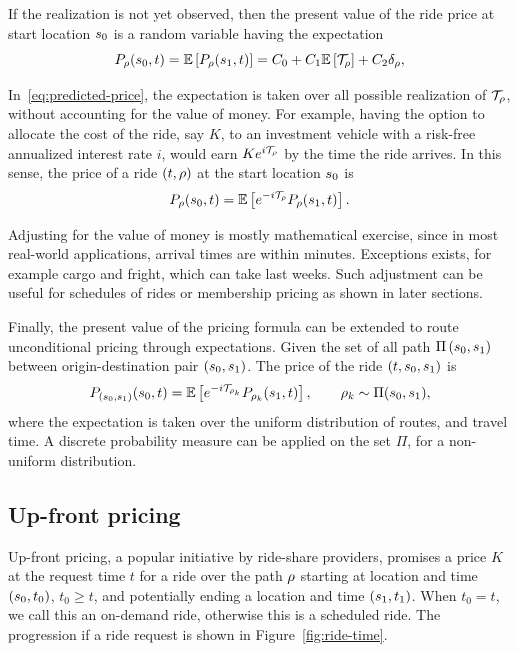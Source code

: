 \documentclass[12pt]{article}
\begin{document}
{{{{{{{{ If the realization is not yet observed, then the present value of the ride price at start location ${s_0}$ is a random variable having the expectation
\begin{equation}\label{eq:predicted-price}
    P_\rho({s_0}, t) = \mathbb{E}\left[P_\rho({ s_1}, t)\right]= C_0 + C_1\mathbb{E}\left[\mathcal{T}_\rho\right] + C_2 \delta_\rho,
 \end{equation}

In~\eqref{eq:predicted-price}, the expectation is taken over all possible realization of $\mathcal{T}_\rho$, without accounting for the value of money. For example, having the option to allocate the cost of the ride, say $K$, to an investment vehicle with a risk-free annualized interest rate $i$, would earn $Ke^{i\mathcal{T}_\rho}$ by the time the ride arrives. In this sense, the price of a ride $(t, \rho)$ at the start location ${s_0}$ is 
\[P_\rho({s_0}, t) = \mathbb{E}\left[e^{-i\mathcal{T}_\rho} P_\rho({ s_1}, t)\right]. \]

Adjusting for the value of money is mostly mathematical exercise, since in most real-world applications, arrival times are within minutes. Exceptions exists, for example cargo and fright, which can take last weeks. Such adjustment can be useful for schedules of rides or membership pricing as shown in later sections.

Finally, the present value of the pricing formula can be extended to route unconditional pricing through expectations. Given the set of all path $\Pi\left({s_0}, { s_1}\right)$  between origin-destination pair $({s_0}, { s_1})$. The price of the ride  $(t, {s_0}, { s_1})$ is
\[P_{\left({s_0}, { s_1}\right)}({s_0}, t) = \mathbb{E}\left[e^{-i\mathcal{T}_{\rho_k}}P_{\rho_k}({ s_1}, t)\right],\qquad \rho_k \sim \Pi({s_0}, { s_1}),\]
where the expectation is taken over the uniform distribution of routes, and travel time. A discrete probability measure can be applied on the set $\Pi$, for a non-uniform distribution.


\subsection{Up-front pricing} \label{sec:upfront}
Up-front pricing, a popular initiative by ride-share providers, promises a price $K$ at the request time $t$ for a ride over the path $\rho$ starting at location and time $({s_0}, t_0)$, $t_0\geq t$, and potentially ending a location and time $({ s_1}, t_1)$. When $t_0=t$, we call this an on-demand ride, otherwise this is a scheduled ride. The progression if a ride request is shown in Figure~\ref{fig:ride-time}. 

}}}}}}}}
\end{document}
